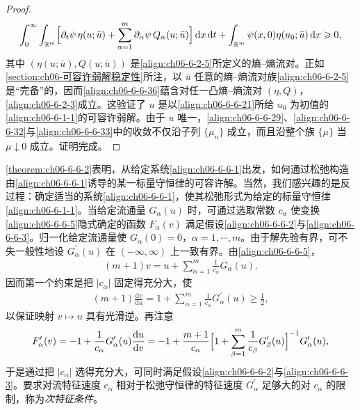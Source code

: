 \documentclass[../../main.tex]{subfiles}
\begin{document}
\begin{proof}
\begin{align}
\int_{0}^{\infty}\int_{\mathbb{R}^{m}}\Bigl{[}\partial_{t}\psi\,\eta(u;\bar{u})+\sum_{\alpha=1}^{m}\partial_{\alpha}\psi\,Q_{\alpha}(u;\bar{u})\Bigr{]}\,\mathrm{d}x\,\mathrm{d}t+\int_{\mathbb{R}^{m}}\psi(x,0)\eta(u_{0};\bar{u})\,\mathrm{d}x\geqslant 0,
\label{align:ch06-6-6-36}
\end{align}
其中 $(\eta(u;\bar{u}),Q(u;\bar{u}))$ 是\eqref{align:ch06-6-2-5}所定义的熵--熵流对。正如\cref{section:ch06-可容许弱解稳定性}所注，以 $\bar{u}$ 任意的熵--熵流对族\eqref{align:ch06-6-2-5}是“完备”的，因而\eqref{align:ch06-6-6-36}蕴含对任一凸熵--熵流对 $(\eta,Q)$，\eqref{align:ch06-6-2-3}成立。这验证了 $u$ 是以\eqref{align:ch06-6-6-21}所给 $u_{0}$ 为初值的\eqref{align:ch06-6-1-1}的可容许弱解。由于 $u$ 唯一，\eqref{align:ch06-6-6-29}、\eqref{align:ch06-6-6-32}与\eqref{align:ch06-6-6-33}中的收敛不仅沿子列 $\{\mu_{n}\}$ 成立，而且沿整个族 $\{\mu\}$ 当 $\mu\downarrow 0$ 成立。证明完成。

\end{proof}

\cref{theorem:ch06-6-6-2}表明，从给定系统\eqref{align:ch06-6-6-1}出发，如何通过松弛构造由\eqref{align:ch06-6-6-1}诱导的某一标量守恒律的可容许解。当然，我们感兴趣的是反过程：确定适当的系统\eqref{align:ch06-6-6-1}，使其松弛形式为给定的标量守恒律\eqref{align:ch06-6-1-1}。当给定流通量 $G_{\alpha}(u)$ 时，可通过选取常数 $c_{\alpha}$ 使变换\eqref{align:ch06-6-6-5}隐式确定的函数 $F_{\alpha}(v)$ 满足假设\eqref{align:ch06-6-6-2}与\eqref{align:ch06-6-6-3}。归一化给定流通量使 $G_{\alpha}(0)=0$，$\alpha=1,\cdots,m$。由于解先验有界，可不失一般性地设 $G_{\alpha}^{\prime}(u)$ 在 $(-\infty,\infty)$ 上一致有界。由\eqref{align:ch06-6-6-5}，
\begin{align}
(m+1)v=u+\sum_{\alpha=1}^{m}\frac{1}{c_{\alpha}}G_{\alpha}(u).
\label{align:ch06-6-6-37}
\end{align}
因而第一个约束是把 $|c_{\alpha}|$ 固定得充分大，使
\begin{align}
(m+1)\frac{\mathrm{d}v}{\mathrm{d}u}=1+\sum_{\alpha=1}^{m}\frac{1}{c_{\alpha}}G_{\alpha}^{\prime}(u)\geqslant\frac{1}{2},
\label{align:ch06-6-6-38}
\end{align}
以保证映射 $v\mapsto u$ 具有光滑逆。再注意
\begin{align}
F_{\alpha}^{\prime}(v)=-1+\frac{1}{c_{\alpha}}G_{\alpha}^{\prime}(u)\frac{\mathrm{d}u}{\mathrm{d}v}=-1+\frac{m+1}{c_{\alpha}}\Bigl{[}1+\sum_{\beta=1}^{m}\frac{1}{c_{\beta}}G_{\beta}^{\prime}(u)\Bigr{]}^{-1}G_{\alpha}^{\prime}(u),
\label{align:ch06-6-6-39}
\end{align}
于是通过把 $|c_{\alpha}|$ 选得充分大，可同时满足假设\eqref{align:ch06-6-6-2}与\eqref{align:ch06-6-6-3}。要求对流特征速度 $c_{\alpha}$ 相对于松弛守恒律的特征速度 $G_{\alpha}^{\prime}$ 足够大的对 $c_{\alpha}$ 的限制，称为\emph{次特征条件}。
\end{document}
